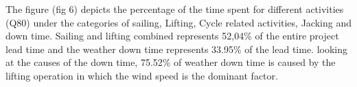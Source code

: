 The figure (fig 6) depicts the percentage of the time spent for different activities (Q80) under the categories of sailing, Lifting, Cycle related activities, Jacking and down time. Sailing and lifting combined represents 52,04\% of the entire project lead time and the weather down time represents 33.95\% of the lead time. looking at the causes of the down time, 75.52\% of weather down time is caused by the lifting operation in which the wind speed is the dominant factor.